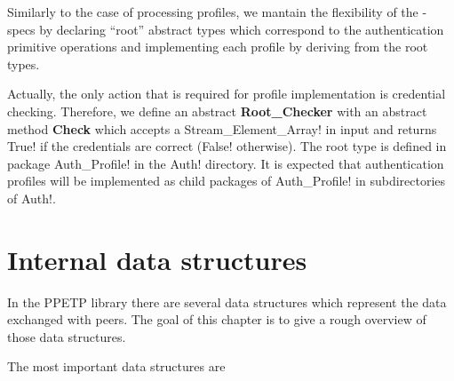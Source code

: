 \documentclass[a4paper]{medusabook}
\begin{document}
Similarly to the case of processing profiles, we mantain the
flexibility of the \ppetp- specs by declaring ``root'' abstract types
which correspond to the authentication primitive operations and
implementing each profile by deriving from the root types.

Actually, the only action that is required for profile implementation
is credential checking.  Therefore, we define an abstract
\textbf{Root\_Checker} with an abstract method \textbf{Check} which
accepts a \ttt Stream_Element_Array! in input and returns \ttt True! if
the credentials are correct (\ttt False! otherwise).  The root type is
defined in package \ttt Auth_Profile! in the \ttt Auth! directory.  It
is expected that authentication profiles will be implemented as child
packages of \ttt Auth_Profile! in subdirectories of \ttt
Auth!. 

\chapter{Internal data structures}
\label{chap:2;overview}

In the PPETP library there are several data structures which represent
the data exchanged with peers.  The goal of this chapter is to give a
rough overview of those data structures.

The most important data structures are
\end{document}
